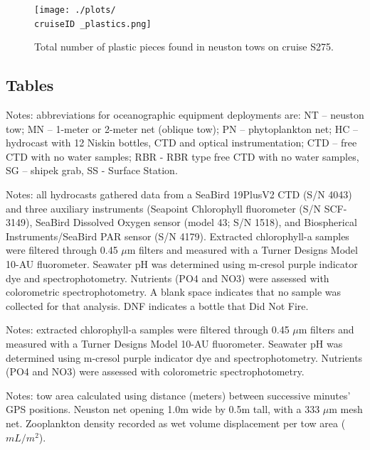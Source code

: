 \documentclass[letterpaper,11pt]{article}
\newcommand{\cruiseID}{S275}
\begin{document}
\begin{figure}[t]
\centering
\texttt{[image: ./plots/\\cruiseID \_plastics.png]}
\caption[Plastic Distribution]{Total number of plastic pieces found in neuston tows on cruise \cruiseID.}
\label{plastics}
\end{figure}



\clearpage
\begin{landscape}
\subsection*{Tables}

\fontsize{10}{12}\selectfont



\noindent Notes: abbreviations for oceanographic equipment deployments are: NT – neuston tow; MN – 1-meter or 2-meter net (oblique tow); PN – phytoplankton net; HC – hydrocast with 12 Niskin bottles, CTD and optical instrumentation; CTD – free CTD with no water samples; RBR - RBR type free CTD with no water samples, SG – shipek grab, SS - Surface Station.


\clearpage


\noindent Notes: all hydrocasts gathered data from a SeaBird 19PlusV2 CTD (S/N 4043) and three auxiliary instruments (Seapoint Chlorophyll fluorometer (S/N SCF-3149), SeaBird Dissolved Oxygen sensor (model 43; S/N 1518), and Biospherical Instruments/SeaBird PAR sensor (S/N 4179). Extracted chlorophyll-a samples were filtered through 0.45 $\mu$m filters and measured with a Turner Designs Model 10-AU fluorometer. Seawater pH was determined using m-cresol purple indicator dye and spectrophotometry. Nutrients (PO4 and NO3) were assessed with colorometric spectrophotometry. A blank space indicates that no sample was collected for that analysis. DNF indicates a bottle that Did Not Fire.

\clearpage


\clearpage

\noindent Notes: extracted chlorophyll-a samples were filtered through 0.45 $\mu$m filters and measured with a Turner Designs Model 10-AU fluorometer. Seawater pH was determined using m-cresol purple indicator dye and spectrophotometry. Nutrients (PO4 and NO3) were assessed with colorometric spectrophotometry.

\clearpage

\noindent Notes: tow area calculated using distance (meters) between successive minutes' GPS positions. Neuston net opening 1.0m wide by 0.5m tall, with a 333 $\mu$m mesh net. Zooplankton density recorded as wet volume displacement per tow area ($mL/m^2$).\\


\end{landscape}
\end{document}

